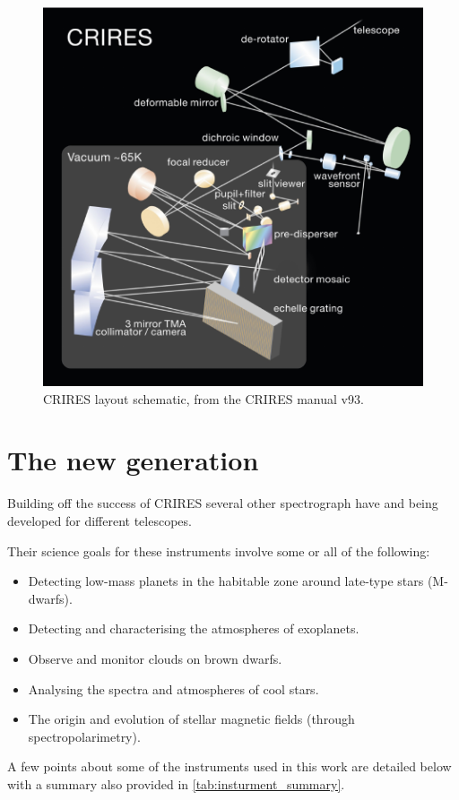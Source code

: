 \begin{figure}
    \centering
    \includegraphics[width=0.7\linewidth]{figures/spectroscopy/CRIRES_schematic.pdf}
    \caption{CRIRES layout schematic, from the CRIRES manual v93.}
    \label{fig:criresschematic}
\end{figure}


\section{The new generation}
\label{subsec:new_generation}
Building off the success of CRIRES several other \nir{} spectrograph have and being developed for different telescopes.

Their science goals for these instruments involve some or all of the following:

\begin{itemize}
\item Detecting low-mass planets in the habitable zone around late-type stars (M-dwarfs).
\item Detecting and characterising the atmospheres of exoplanets.
\item Observe and monitor clouds on brown dwarfs.
\item Analysing the spectra and atmospheres of cool stars.
\item The origin and evolution of stellar magnetic fields (through spectropolarimetry).
\end{itemize}

A few points about some of the \nir{} instruments used in this work are detailed below with a summary also provided in \cref{tab:insturment_summary}.

